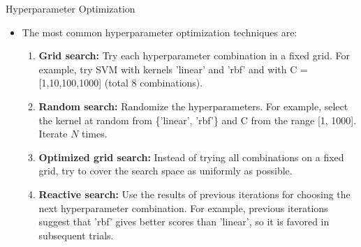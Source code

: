 \documentclass[10pt, aspectratio=169]{beamer} %
\begin{document}
\begin{frame}{Hyperparameter Optimization}
	\begin{itemize}
		\item The most common hyperparameter optimization techniques are:
		\begin{enumerate}
			\item \textbf{Grid search:} Try each hyperparameter combination in a fixed grid. For example, try SVM with 
			kernels 'linear' and 'rbf' and with C = [1,10,100,1000] (total 8 combinations).
			\item \textbf{Random search:} Randomize the hyperparameters. For example, select the kernel at
			random from \{'linear', 'rbf'\} and C from the range [1, 1000]. Iterate $N$ times.
			\item \textbf{Optimized grid search:} Instead of trying all combinations on a fixed grid, try
			to cover the search space as uniformly as possible.
			\item \textbf{Reactive search:} Use the results of previous iterations for choosing the next hyperparameter combination.
			For example, previous iterations suggest that 'rbf' gives better scores than 'linear', so it is
			favored in subsequent trials.
		\end{enumerate}
	\end{itemize}
\end{frame}
\end{document}
